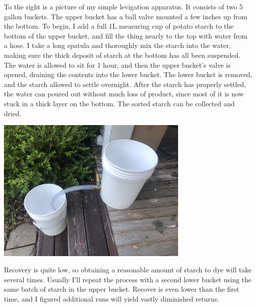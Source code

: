 \documentclass[11pt]{article}
\begin{document}
To the right is a picture of my simple levigation apparatus. It consists of two 5 gallon buckets. The upper bucket has a ball valve mounted a few inches up from the bottom. To begin, I add a full 1L measuring cup of potato starch to the bottom of the upper bucket, and fill the thing nearly to the top with water from a hose. I take a long spatula and thoroughly mix the starch into the water, making sure the thick deposit of starch at the bottom has all been suspended. The water is allowed to sit for 1 hour, and then the upper bucket's valve is opened, draining the contents into the lower bucket. The lower bucket is removed, and the starch allowed to settle overnight. After the starch has properly settled, the water can poured out without much loss of product, since most of it is now stuck in a thick layer on the bottom. The sorted starch can be collected and dried.\newline

\begin{center}
\includegraphics[height=7cm]{img/part1_1.jpg}
\end{center}

Recovery is quite low, so obtaining a reasonable amount of starch to dye will take several times. Usually I'll repeat the process with a second lower bucket using the same batch of starch in the upper bucket. Recover is even lower than the first time, and I figured additional runs will yield vastly diminished returns.\newline
\end{document}
